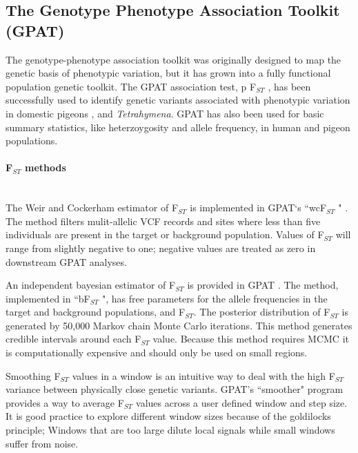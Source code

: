 \documentclass[10pt,letterpaper]{article}
\begin{document}
\subsection*{The Genotype Phenotype Association Toolkit (GPAT)}

The genotype-phenotype association toolkit was originally designed to map the genetic basis of phenotypic variation, but it has grown into a fully functional population genetic toolkit.  The GPAT association test, p F$_{ST}$ , has been successfully used to identify genetic variants associated with phenotypic variation in domestic pigeons
 \cite{color},  and \textit{Tetrahymena}\cite{tet}.  GPAT has also been used for basic summary statistics, like heterzoygosity and allele frequency, in human\cite{iron} and pigeon\cite{pigeon} populations.




\paragraph*{ F$_{ST}$  methods} \mbox{} \\

The Weir and Cockerham estimator of F$_{ST}$ is implemented in GPAT`s ``wcF$_{ST}$ " \cite{fst}.  The method filters mulit-allelic VCF records and sites where less than five individuals are present in the target or background population. Values of F$_{ST}$ will range from slightly negative to one; negative values are treated as zero in downstream GPAT analyses. 

An independent bayesian estimator of F$_{ST}$ is provided in GPAT \cite{bfst}.  The method, implemented in ``bF$_{ST}$ ", has free parameters for the allele frequencies in the target and background populations, and F$_{ST}$.  The posterior distribution of F$_{ST}$ is generated by 50,000 Markov chain Monte Carlo iterations.  This method generates credible intervals around each F$_{ST}$ value.  Because this method requires MCMC it is computationally expensive and should only be used on small regions.

Smoothing F$_{ST}$  values in a window is an intuitive way to deal with the high F$_{ST}$ variance between physically close genetic variants.  GPAT's ``smoother" program provides a way to average  F$_{ST}$  values across a user defined window and step size.  It is good practice to explore different window sizes because of the goldilocks principle; Windows that are too large dilute local signals while small windows suffer from noise.
\end{document}
